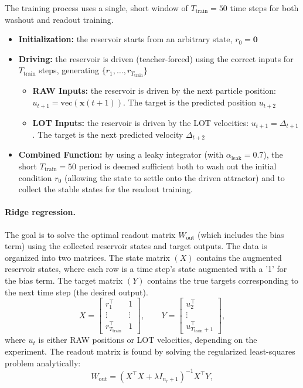 \documentclass[11pt]{article}
\newcommand{\1}{\mathbf{1}}
\begin{document}
The training process uses a single, short window of $T_{\text{train}} = 50$ time steps for both washout and readout training. 
\begin{itemize}
\item \textbf{Initialization:} the reservoir starts from an arbitrary state, $r_0 = \mathbf{0}$

\item \textbf{Driving:} the reservoir is driven (teacher-forced) using the correct inputs for $T_\text{train}$ steps, generating $\{r_1, \dots, r_{T_{\text{train}}}\}$
\begin{itemize}
    \item \textbf{RAW Inputs:} the reservoir is driven by the next particle position: $u_{t+1} = \text{vec}(\mathbf{x}(t+1))$. The target is the predicted position $u_{t+2}$

    \item \textbf{LOT Inputs:} the reservoir is driven by the LOT velocities: $u_{t+1} = \Delta_{t+1}$. The target is the next predicted velocity $\Delta_{t+2}$
\end{itemize}

\item \textbf{Combined Function:} by using a leaky integrator (with $\alpha_{\text{leak}}=0.7$), the short $T_{\text{train}}=50$ period is deemed sufficient both to wash out the initial condition $r_0$ (allowing the state to settle onto the driven attractor) and to collect the stable states for the readout training.
\end{itemize}

\paragraph{Ridge regression.} The goal is to solve the optimal readout matrix $W_{\text{out}}$ (which includes the bias term) using the collected reservoir states and target outputs. The data is organized into two matrices. The state matrix $(X)$ contains the augmented reservoir states, where each row is a time step's state augmented with a '1' for the bias term. The target matrix $(Y)$ contains the true targets corresponding to the next time step (the desired output). 
\begin{equation}
X = 
\begin{bmatrix} 
r_1^\top & 1 \\ 
\vdots & \vdots \\ 
r_{T_{\text{train}}}^\top & 1 
\end{bmatrix},
\qquad
Y = 
\begin{bmatrix} 
u_2^\top \\ 
\vdots \\ 
u_{T_{\text{train}}+1}^\top 
\end{bmatrix},
\end{equation}
where $u_t$ is either RAW positions or LOT velocities, depending on the experiment. The readout matrix is found by solving the regularized least-squares problem analytically:
\begin{equation}\label{eq:ridge-solve}
W_{\text{out}} = (X^\top X + \lambda I_{n_r + 1})^{-1} X^\top Y,
\end{equation}
\end{document}

